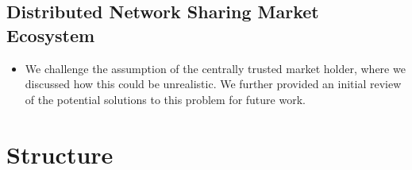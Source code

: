 \subsection{Distributed Network Sharing Market Ecosystem}
\begin{itemize}


\item We challenge the assumption of the centrally trusted market holder, where we discussed how this could be unrealistic. We further provided an initial review of the potential solutions to this problem for future work.


\end{itemize}



\section{Structure}

